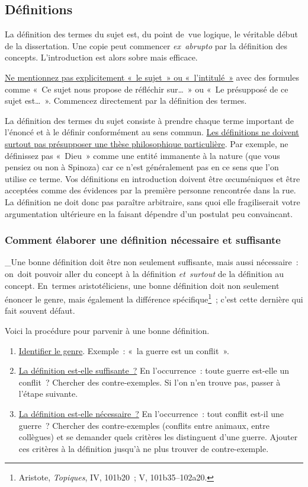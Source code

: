 \documentclass[a4paper,12pt]{article}
\begin{document}
\subsection{Définitions}
\label{sec:org1461b68}
\label{org484abca}

La définition des termes du sujet est, du point de vue logique, le
véritable début de la dissertation. Une copie peut commencer
\emph{ex abrupto} par la définition des concepts. L'introduction est alors
sobre mais efficace.

\uline{Ne mentionnez pas explicitement « le sujet » ou « l'intitulé »} avec
des formules comme « Ce sujet nous propose de réfléchir sur\ldots{} » ou « Le
présupposé de ce sujet est\ldots{} ». Commencez directement par la définition
des termes.

La définition des termes du sujet consiste à prendre chaque terme
important de l'énoncé et à le définir conformément au sens commun. \uline{Les
définitions ne doivent surtout pas présupposer une thèse philosophique
particulière}. Par exemple, ne définissez pas « Dieu » comme une entité
immanente à la nature (que vous pensiez ou non à Spinoza) car ce n'est
généralement pas en ce sens que l'on utilise ce terme. Vos définitions
en introduction doivent être œcuméniques et être acceptées comme des
évidences par la première personne rencontrée dans la rue. La définition
ne doit donc pas paraître arbitraire, sans quoi elle fragiliserait votre
argumentation ultérieure en la faisant dépendre d'un postulat peu
convaincant.

\subsubsection{Comment élaborer une définition nécessaire et suffisante}
\label{sec:org6516dbe}

\_Une bonne définition doit être non seulement suffisante, mais aussi
nécessaire : on doit pouvoir aller du concept à la définition
\emph{et surtout} de la définition au concept. En termes aristotéliciens, une
bonne définition doit non seulement énoncer le genre, mais également la
différence spécifique\footnote{Aristote, \emph{Topiques}, IV, 101b20 ; V, 101b35--102a20.} ; c'est cette dernière qui fait souvent
défaut.

Voici la procédure pour parvenir à une bonne définition. 

\begin{enumerate}
\item \uline{Identifier le genre}. Exemple : « la guerre est un conflit ».
\item \uline{La définition est-elle suffisante ?} En l'occurrence : toute guerre
est-elle un conflit ? Chercher des contre-exemples. Si l'on n'en
trouve pas, passer à l'étape suivante.
\item \uline{La définition est-elle nécessaire ?} En l'occurrence : tout conflit
est-il une guerre ? Chercher des contre-exemples (conflits entre
animaux, entre collègues) et se demander quels critères les
distinguent d'une guerre. Ajouter ces critères à la définition
jusqu'à ne plus trouver de contre-exemple.
\end{enumerate}
\end{document}
